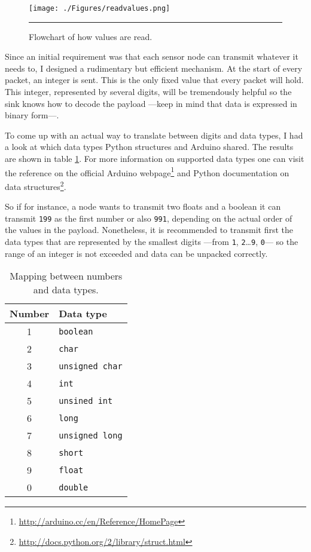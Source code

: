 \begin{figure}[htbp]
    \centering
        \texttt{[image: ./Figures/readvalues.png]}
        \rule{35em}{0.5pt}
    \caption[Value reading flowchart]{Flowchart of how values are read.}
    \label{fig:readvalues}
\end{figure}

Since an initial requirement was that each sensor node can transmit whatever it needs to, I designed a rudimentary but efficient mechanism. At the start of every packet, an integer is sent. This is the only fixed value that every packet will hold. This integer, represented by several digits, will be tremendously helpful so the sink knows how to decode the payload ---keep in mind that data is expressed in binary form---.

To come up with an actual way to translate between digits and data types, I had a look at which data types Python structures and Arduino shared. The results are shown in table \ref{tab:mapnumbers}. For more information on supported data types one can visit the reference on the official Arduino webpage\footnote{\url{http://arduino.cc/en/Reference/HomePage}} and Python documentation on data structures\footnote{\url{http://docs.python.org/2/library/struct.html}}.

So if for instance, a node wants to transmit two floats and a boolean it can transmit \texttt{199} as the first number or also \texttt{991}, depending on the actual order of the values in the payload. Nonetheless, it is recommended to transmit first the data types that are represented by the smallest digits ---from \texttt{1}, \texttt{2}\ldots\texttt{9}, \texttt{0}--- so the range of an integer is not exceeded and data can be unpacked correctly.

\begin{table}[ht] 
\centering
\begin{tabular}{c|l}
Number          & Data type             \\
\hline
1               & \texttt{boolean}      \\
2               & \texttt{char}         \\
3               & \texttt{unsigned char}\\
4               & \texttt{int}          \\
5               & \texttt{unsined int}  \\
6               & \texttt{long}         \\
7               & \texttt{unsigned long}\\
8               & \texttt{short}        \\
9               & \texttt{float}        \\
0               & \texttt{double}       \\
\end{tabular}
\caption{Mapping between numbers and data types.}
\label{tab:mapnumbers}
\end{table}


